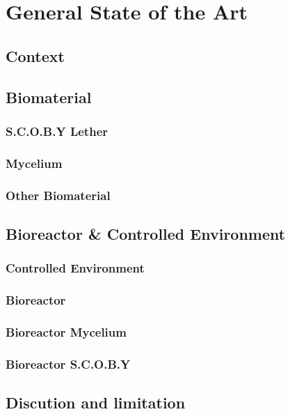 \chapter{General State of the Art}


\section{Context}


\section{Biomaterial}

\subsection{S.C.O.B.Y Lether}
\subsection{Mycelium}
\subsection{Other Biomaterial}

\section{Bioreactor & Controlled Environment }

\subsection{Controlled Environment}
\subsection{Bioreactor}
\subsection{Bioreactor Mycelium}
\subsection{Bioreactor S.C.O.B.Y}


\section{Discution and limitation}